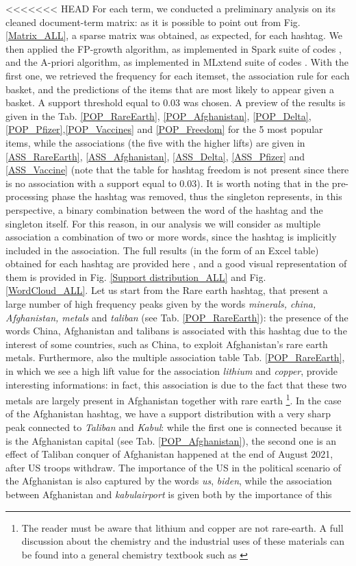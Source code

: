 \documentclass[12pt,%
               a4paper,%
               oneside,openany,%
               titlepage,%
               headinclude,footinclude,%
               BCOR5mm,%
               cleardoublepage=empty,%
               tablecaptionabove,%
               floatperchapter,
               ]{scrreprt}                 %
\begin{document}
<<<<<<< HEAD
For each term, we conducted a preliminary analysis on its cleaned document-term matrix: as it is possible to point out from Fig. \ref{Matrix_ALL}, a sparse matrix was obtained, as expected,  for each hashtag.  We then applied the FP-growth algorithm,  as implemented in Spark suite of codes \cite{zaharia2016apache} ,  and the A-priori algorithm,  as implemented in MLxtend suite of codes \cite{raschka2018mlxtend}. With the first one, we retrieved the frequency for each itemset,  the association rule for each basket, and the predictions of the items that are most likely to appear given a basket.  A support threshold equal to 0.03 was chosen. A preview of the results is given in the Tab. \ref{POP_RareEarth}, \ref{POP_Afghanistan}, \ref{POP_Delta}, \ref{POP_Pfizer},\ref{POP_Vaccines} and \ref{POP_Freedom}  for the 5 most popular items, while the associations (the five with the higher lifts) are given in \ref{ASS_RareEarth}, \ref{ASS_Afghanistan}, \ref{ASS_Delta}, \ref{ASS_Pfizer} and \ref{ASS_Vaccine} (note that the table for hashtag freedom is not present since there is no association with a support equal to 0.03). It is worth noting that in the pre-processing phase the hashtag was removed, thus the singleton represents, in this perspective, a binary combination between the word of the hashtag and the singleton itself. For this reason, in our analysis we will consider as multiple association a combination of two or more words, since the hashtag is implicitly included in the association. The full results (in the form of an Excel table) obtained for each hashtag are provided here \cite{Folder},  and a good visual representation of them is provided in Fig. \ref{Support distribution_ALL} and Fig. \ref{WordCloud_ALL}.  Let us start from the Rare earth hashtag, that present a large number of high frequency peaks given by the words \textit{minerals, china, Afghanistan, metals} and \textit{taliban} (see Tab. \ref{POP_RareEarth}): the presence of the words China, Afghanistan and talibans is associated with this hashtag due to the interest of some countries, such as China, to exploit Afghanistan’s rare earth metals. Furthermore, also the multiple association table Tab. \ref{POP_RareEarth}, in which we see a high lift value for the association \textit{lithium} and \textit{copper}, provide interesting informations: in fact, this association is due to the fact that these two metals are largely present in Afghanistan together with rare earth \footnote{The reader must be aware that lithium and copper are not rare-earth. A full discussion about the chemistry and the industrial uses of these materials can be found into a general chemistry textbook such as \cite{petrucci2010general}}. In the case of the Afghanistan hashtag, we have a support distribution with a very sharp peak connected to \textit{Taliban} and \textit{Kabul}: while the first one is connected because it is the Afghanistan capital (see Tab. \ref{POP_Afghanistan}), the second one is an effect of Taliban conquer of Afghanistan happened at the end of August 2021, after US troops withdraw. The importance of the US in the political scenario of the Afghanistan is also captured by the words \textit{us}, \textit{biden}, while the association between Afghanistan and \textit{kabulairport} is given both by the importance of this 
\end{document}

